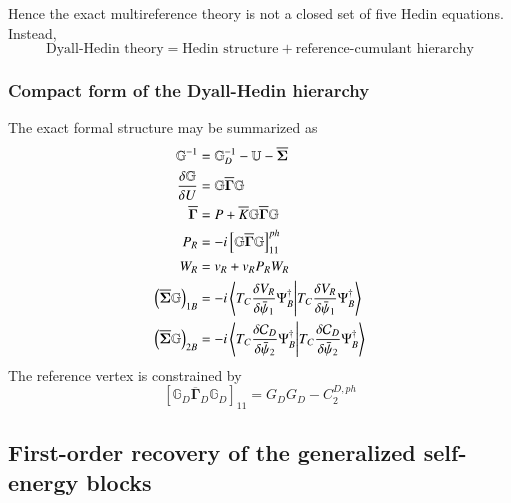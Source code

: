\documentclass[aip,jcp,reprint,noshowkeys,superscriptaddress]{revtex4-1}
\begin{document}
Hence the exact multireference theory is not a closed set of five Hedin
equations.  Instead,
\begin{equation}
  \text{Dyall-Hedin theory}
  =
  \text{Hedin structure}
  +
  \text{reference-cumulant hierarchy}
  \label{eq:mr-hedin-summary}
\end{equation}


\subsubsection{Compact form of the Dyall-Hedin hierarchy}

The exact formal structure may be summarized as
\begin{subequations}
  \label{eq:dyall-hedin-set}
  \begin{align}
    \mathbb G^{-1}
    &=
    \mathbb G_D^{-1}
    -
    \mathbb U
    -
    \overline{\boldsymbol\Sigma}
    \\
    \frac{\delta\mathbb G}{\delta U}
    &=
    \mathbb G
    \overline{\boldsymbol\Gamma}
    \mathbb G
    \\
    \overline{\boldsymbol\Gamma}
    &=
    P
    +
    \overline K
    \mathbb G
    \overline{\boldsymbol\Gamma}
    \mathbb G
    \\
    P_R
    &=
    -i
    \left[
      \mathbb G
      \overline{\boldsymbol\Gamma}
      \mathbb G
    \right]_{11}^{ph}
    \\
    W_R
    &=
    v_R
    +
    v_RP_RW_R
    \\
    \left(
      \overline{\boldsymbol\Sigma}
      \mathbb G
    \right)_{1B}
    &=
    -i
    \braket{
      T_C
      \frac{
        \delta V_R
      }{
        \delta\bar\psi_1
      }
      \Psi_B^\dagger
    }
    \\
    \left(
      \overline{\boldsymbol\Sigma}
      \mathbb G
    \right)_{2B}
    &=
    -i
    \braket{
      T_C
      \frac{
        \delta\mathcal C_D
      }{
        \delta\bar\psi_2
      }
      \Psi_B^\dagger
    }
  \end{align}
\end{subequations}
The reference vertex is constrained by
\begin{equation}
  \left[
    \mathbb G_D
    \overline{\boldsymbol\Gamma}_D
    \mathbb G_D
  \right]_{11}
  =
  G_DG_D
  -
  C_2^{D,ph}
  \label{eq:dyall-reference-condition}
\end{equation}
\subsection{First-order recovery of the generalized self-energy blocks}
\label{sec:first-order-blocks}
\end{document}

